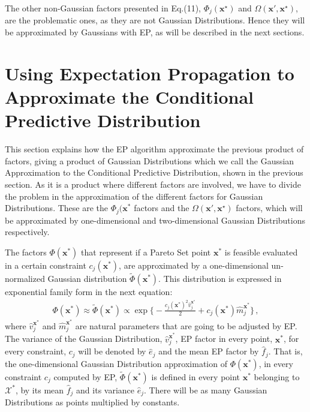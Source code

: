 The other non-Gaussian factors presented in Eq.(11), $\Phi_j(\textbf{x}^{\star})$ and  $\Omega(\textbf{x}',\textbf{x}^{\star})$, are the problematic ones, as they are not Gaussian Distributions. Hence they will be approximated by Gaussians with EP, as will be described in the next sections.

\section{Using Expectation Propagation to Approximate the Conditional Predictive Distribution}

This section explains how the EP algorithm approximate the previous product of factors, giving a product of Gaussian Distributions which we call the Gaussian Approximation to the Conditional Predictive Distribution, shown in the previous section. As it is a product where different factors are involved, we have to divide the problem in the approximation of the different factors for Gaussian Distributions. These are the $\Phi_j(\boldsymbol{x}^*$ factors and the $\Omega(\textbf{x}',\textbf{x}^{\star})$ factors, which will be approximated by one-dimensional and two-dimensional Gaussian Distributions respectively.

The factors $\Phi(\boldsymbol{x}^*)$ that represent if a Pareto Set point $\boldsymbol{x}^*$ is feasible evaluated in a certain constraint $c_j(\boldsymbol{x}^*)$, are approximated by a one-dimensional un-normalized Gaussian distribution $\tilde{\Phi}(\boldsymbol{x}^*)$. This distribution is expressed in exponential family form in the next equation:
\begin{align}
    \Phi(\boldsymbol{x}^*) \approx \tilde{\Phi}(\boldsymbol{x}^*) \propto \exp\bigg\{ - \frac{c_j(\boldsymbol{x}^{*})^{2}\hat{v}_{j}^{\boldsymbol{x}^{*}}}{2} + c_j(\boldsymbol{x}^*)\hat{m}_{j}^{\boldsymbol{x}^*}\bigg\}\,,
\end{align}
where $\hat{v}_{j}^{\boldsymbol{x}^{*}}$ and $\hat{m}_{j}^{\boldsymbol{x}^*}$ are natural parameters that are going to be adjusted by EP. The variance of the Gaussian Distribution, $\hat{v}_{j}^{\boldsymbol{x}^{*}}$, EP factor in every point, $\boldsymbol{x}^*$, for every constraint, $c_j$ will be denoted by $\hat{e}_{j}$ and the mean EP factor by $\hat{f}_{j}$. That is, the one-dimensional Gaussian Distribution approximation of ${\Phi}(\boldsymbol{x}^*)$, in every constraint $c_j$ computed by EP, $\tilde{\Phi}(\boldsymbol{x}^*)$ is defined in every point $\boldsymbol{x}^*$ belonging to $\mathcal{X}^*$, by its mean $\hat{f}_{j}$ and its variance $\hat{e}_{j}$. There will be as many Gaussian Distributions as points multiplied by constants.

